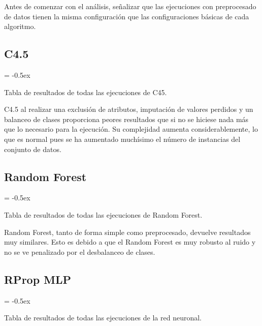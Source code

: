 \documentclass[paper=a4, fontsize=12pt]{article} %
\numberwithin{equation}{section} %
\numberwithin{figure}{section} %
\numberwithin{table}{section} %
\begin{document}
Antes de comenzar con el análisis, señalizar que las ejecuciones con preprocesado de datos tienen la misma configuración que las configuraciones básicas de cada algoritmo.

\subsection {C4.5}

	\extrarowheight = -0.5ex %
	\renewcommand{\arraystretch}{1.75} %
	\begin{table}[H]
		\begin{center}
		\end{center}
		\caption {Tabla de resultados de todas las ejecuciones de C45.}
		\label {C45comparation2}
	\end{table}

C4.5 al realizar una exclusión de atributos, imputación de valores perdidos y un balanceo de clases proporciona peores resultados que si no se hiciese nada más que lo necesario para la ejecución. Su complejidad aumenta considerablemente, lo que es normal pues se ha aumentado muchísimo el número de instancias del conjunto de datos.

\subsection {Random Forest}

	\extrarowheight = -0.5ex %
	\renewcommand{\arraystretch}{1.75} %
	\begin{table}[H]
		\begin{center}
		\end{center}
		\caption {Tabla de resultados de todas las ejecuciones de Random Forest.}
		\label {RFcomparation2}
	\end{table}

Random Forest, tanto de forma simple como preprocesado, devuelve resultados muy similares. Esto es debido a que el Random Forest es muy robusto al ruido y no se ve penalizado por el desbalanceo de clases.

\subsection {RProp MLP}

	\extrarowheight = -0.5ex %
	\renewcommand{\arraystretch}{1.75} %
	\begin{table}[H]
		\begin{center}
		\end{center}
		\caption {Tabla de resultados de todas las ejecuciones de la red neuronal.}
		\label {NNcomparation2}
	\end{table}
\end{document}
